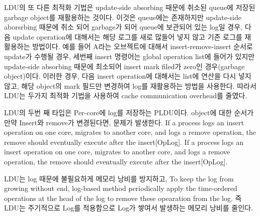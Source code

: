 \else
\fi



\ifkor
LDU의 또 다른 최적화 기법은 update-side absorbing 때문에 취소된 queue에 저장된 garbage object를 재활용하는
것이다.
이것은 queue에는 존재하지만 update-side aborsrbing 때문에 취소 되어 garbage가 되어 queue에 보관되어 있는
log일 경우, 다음 update operation에 대해서는 해당 로그를 새로 많들어 넣지 않고 기존 로그를 재활용하는 방법이다. 
예를 들어 A라는 오브젝트에 대해서 insert-remove-insert 순서로 update가 수행될 경우, 세번째 insert 명령어는
global operation list에 들어가 있지만 update-side absorbing 때문에 최소되어  insert mark
filed가 zero인 경우(garbage object)이다. 
이러한 경우, 다음 insert operation에 대해서는 list에 연산을 다시 넣지 않고, 해당 object의 mark 필드만 변경하여
log를 재활용하는 방법을 사용한다. 따라서 LDU는 두가지 최적화 기법을 사용하여 cache communication overhead를
줄였다.
\else
\fi



\ifkor
LDU의 두번 째 타입은 Per-core에 log를 저장하는 PLDU이다.  
object에 대한 순서가 만약 Insert와 remove가 변경된다면, 문제가 발생한다. 
If a process logs an insert operation on one core,
migrates to another core, and logs a remove operation, the remove should
eventually execute after the insert[OpLog].
\else
If a process logs an insert operation on one core,
migrates to another core, and logs a remove operation, the remove should
eventually execute after the insert[OpLog].
\fi







\ifkor
LDU는 log 때문에 불필요하게 메모리 낭비를 방지하고, To keep the log from growing without end,
log-based method periodically apply the time-ordered operations at the head of
the log to remove these opearation from the log.
즉 LDU는 주기적으로 Log를 적용함으로 Log가 쌓여서 발생하는 메모리 낭비를 줄인다.
\else
\fi



